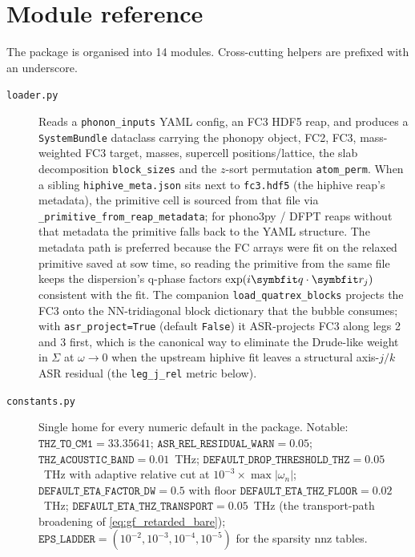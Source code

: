 \section{Module reference}
\label{ap:fa_modules}

The package is organised into 14 modules.  Cross-cutting helpers are
prefixed with an underscore.

\begin{description}
\item[\texttt{loader.py}] Reads a \texttt{phonon\_inputs} YAML config, an FC3
  HDF5 reap, and produces a \texttt{SystemBundle} dataclass carrying
  the phonopy object, FC2, FC3, mass-weighted FC3 target, masses,
  supercell positions/lattice, the slab decomposition
  \texttt{block\_sizes} and the $z$-sort permutation
  \texttt{atom\_perm}.  When a sibling \texttt{hiphive\_meta.json}
  sits next to \texttt{fc3.hdf5} (the hiphive reap's metadata), the
  primitive cell is sourced from that file via
  \texttt{\_primitive\_from\_reap\_metadata}; for phono3py / DFPT
  reaps without that metadata the primitive falls back to the YAML
  structure.  The metadata path is preferred because the FC arrays
  were fit on the relaxed primitive saved at sow time, so reading
  the primitive from the same file keeps the dispersion's q-phase
  factors $\exp(i\vc{q}\cdot \vc{r}_j)$ consistent with the fit.  The
  companion \texttt{load\_quatrex\_blocks} projects the FC3 onto the
  NN-tridiagonal block dictionary that the bubble consumes; with
  \texttt{asr\_project=True} (default \texttt{False}) it ASR-projects
  FC3 along legs 2 and 3 first, which is the canonical way to
  eliminate the Drude-like weight in $\Sigma$ at $\omega \to 0$ when
  the upstream hiphive fit leaves a structural axis-$j/k$ ASR residual
  (the \texttt{leg\_j\_rel} metric below).

\item[\texttt{constants.py}] Single home for every numeric default in
  the package.  Notable: $\texttt{THZ\_TO\_CM1} = 33.35641$;
  $\texttt{ASR\_REL\_RESIDUAL\_WARN} = 0.05$;
  $\texttt{THZ\_ACOUSTIC\_BAND} = 0.01$~THz;
  $\texttt{DEFAULT\_DROP\_THRESHOLD\_THZ} = 0.05$~THz with adaptive
  relative cut at $10^{-3}\times \max|\omega_n|$;
  $\texttt{DEFAULT\_ETA\_FACTOR\_DW} = 0.5$ with floor
  $\texttt{DEFAULT\_ETA\_THZ\_FLOOR} = 0.02$~THz;
  $\texttt{DEFAULT\_ETA\_THZ\_TRANSPORT} = 0.05$~THz (the transport-path
  broadening of \cref{eq:gf_retarded_bare});
  $\texttt{EPS\_LADDER} = (10^{-2}, 10^{-3}, 10^{-4}, 10^{-5})$ for the
  sparsity nnz tables.


\end{description}

